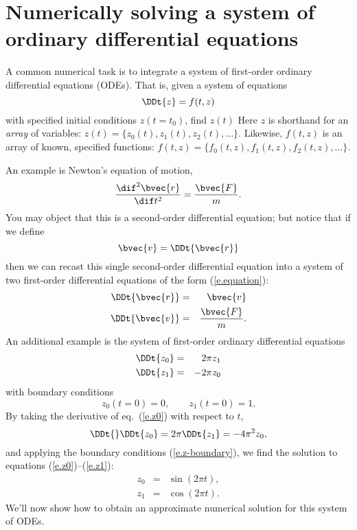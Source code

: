 \section[Solving a system of ordinary differential equations]{Numerically solving a system of ordinary differential equations}
A common numerical task is to integrate a system of first-order ordinary differential equations (ODEs). That is, given a system of equations
\begin{equation}\label{e.equation}
\DDt{z} = f(t,z)
\end{equation}
with specified initial conditions $z(t=t_{0})$, find $z(t)$
Here $z$ is shorthand for an \emph{array} of variables: $z(t) = \{ z_{0}(t), z_{1}(t), z_{2}(t), \ldots\}$. Likewise, $f(t,z)$ is an array of known, specified functions: $f(t,z) = \{f_{0}(t,z), f_{1}(t,z), f_{2}(t,z), \ldots\}$.

An example is Newton's equation of motion,
\begin{equation}\label{e.Newton-2nd}
\frac{\dif^{2}\bvec{r}}{\dif t^{2}} = \frac{\bvec{F}}{m}.
\end{equation}
You may object that this is a second-order differential equation; but notice that if we define
\[
	\bvec{v} = \DDt{\bvec{r}}
\]
then we can recast this single second-order differential equation into a system of two first-order differential equations of the form (\ref{e.equation}):
\begin{eqnarray}
	\DDt{\bvec{r}} &=& \bvec{v}\\
	\DDt{\bvec{v}} &=& \frac{\bvec{F}}{m}.
\end{eqnarray}
An additional example is the system of first-order ordinary differential equations
\begin{eqnarray}
\DDt{z_{0}} &=&  2\pi z_{1}\label{e.z0}\\
\DDt{z_{1}} &=& -2\pi z_{0}\label{e.z1}
\end{eqnarray}
with boundary conditions
\begin{equation}\label{e.z-boundary}
	z_{0}(t=0) = 0,\qquad z_{1}(t=0) = 1.
\end{equation}
By taking the derivative of eq.~(\ref{e.z0}) with respect to $t$,
\[
	\DDt{}\DDt{z_{0}} = 2\pi\DDt{z_{1}} = -4\pi^{2} z_{0},
\]
and applying the boundary conditions (\ref{e.z-boundary}),
we find the solution to equations (\ref{e.z0})--(\ref{e.z1}):
\begin{eqnarray}
z_{0} &=& \sin(2\pi t),\label{e.z0-sol}\\
z_{1} &=& \cos(2\pi t).\label{e.z1-sol}
\end{eqnarray}
We'll now show how to obtain an approximate numerical solution for this system of ODEs.

